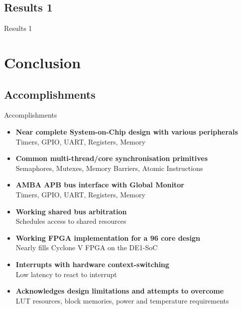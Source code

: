 \documentclass[aspectratio=169]{beamer}
\begin{document}
\subsection{Results 1}
\begin{frame}{Results 1}
\end{frame}

\section{Conclusion}
\frame{\tableofcontents[currentsection, subsectionstyle=show/show/hide]}

\subsection{Accomplishments}
\begin{frame}{Accomplishments}
\begin{itemize}
    \item \textbf{Near complete System-on-Chip design with various peripherals}\\
    Timers, GPIO, UART, Registers, Memory
    
    \item \textbf{Common multi-thread/core synchronisation primitives}\\
    Semaphores, Mutexes, Memory Barriers, Atomic Instructions
    
    \item \textbf{AMBA APB bus interface with Global Monitor}\\
    Timers, GPIO, UART, Registers, Memory
    
    \item \textbf{Working shared bus arbitration}\\
    Schedules access to shared resources
    
    \item \textbf{Working FPGA implementation for a 96 core design}\\
    Nearly fills Cyclone V FPGA on the DE1-SoC
    
    \item \textbf{Interrupts with hardware context-switching}\\
    Low latency to react to interrupt
    
    \item \textbf{Acknowledges design limitations and attempts to overcome}\\
    LUT resources, block memories, power and temperature requirements
\end{itemize}
\end{frame}
\end{document}
